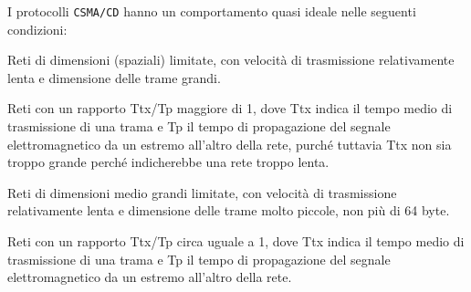 \question
I protocolli \texttt{CSMA/CD} hanno un comportamento quasi ideale nelle seguenti condizioni:

\begin{checkboxes}
	\CorrectChoice Reti di dimensioni (spaziali) limitate, con velocità di trasmissione relativamente lenta e dimensione delle trame grandi.

	\choice Reti con un rapporto Ttx/Tp maggiore di 1, dove Ttx indica il tempo medio di trasmissione di una trama e Tp il tempo di propagazione del segnale elettromagnetico da un estremo all'altro della rete, purché tuttavia Ttx non sia troppo grande perché indicherebbe una rete troppo lenta.

	\choice Reti di dimensioni medio grandi limitate, con velocità di trasmissione relativamente lenta e dimensione delle trame molto piccole, non più di 64 byte.

	\choice Reti con un rapporto Ttx/Tp circa uguale a 1, dove Ttx indica il tempo medio di trasmissione di una trama e Tp il tempo di propagazione del segnale elettromagnetico da un estremo all'altro della rete.
\end{checkboxes}
